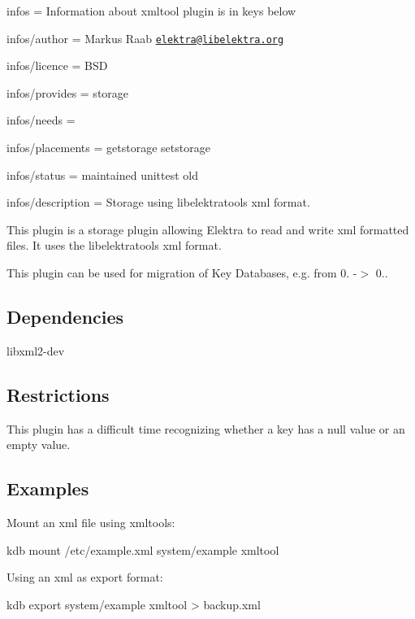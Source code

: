 
\begin{DoxyItemize}
\item infos = Information about xmltool plugin is in keys below
\item infos/author = Markus Raab \href{mailto:elektra@libelektra.org}{\tt elektra@libelektra.\+org}
\item infos/licence = B\+S\+D
\item infos/provides = storage
\item infos/needs =
\item infos/placements = getstorage setstorage
\item infos/status = maintained unittest old
\item infos/description = Storage using libelektratools xml format.
\end{DoxyItemize}

This plugin is a storage plugin allowing Elektra to read and write xml formatted files. It uses the libelektratools xml format.

This plugin can be used for migration of Key Databases, e.\+g. from 0. -\/$>$ 0..

\subsection*{Dependencies}


\begin{DoxyItemize}
\item {\ttfamily libxml2-\/dev}
\end{DoxyItemize}

\subsection*{Restrictions}

This plugin has a difficult time recognizing whether a key has a null value or an empty value.

\subsection*{Examples}

Mount an xml file using {\ttfamily xmltools}\+: \begin{DoxyVerb}    kdb mount /etc/example.xml system/example xmltool
\end{DoxyVerb}


Using an xml as export format\+: \begin{DoxyVerb}    kdb export system/example xmltool > backup.xml\end{DoxyVerb}
 